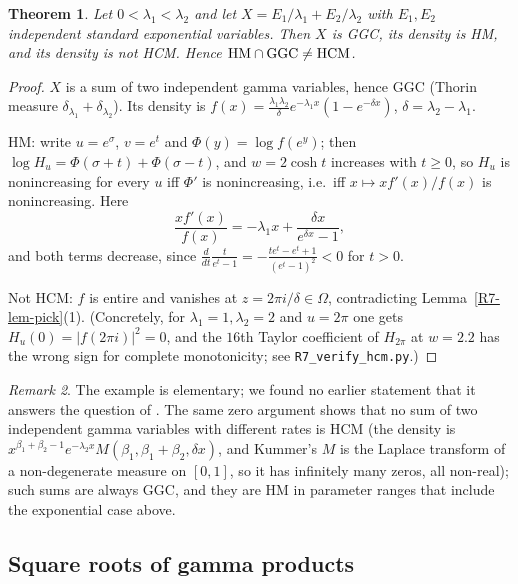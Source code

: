 \documentclass[11pt]{amsart}
\newtheorem{theorem}{Theorem}[section]
\theoremstyle{definition}
\theoremstyle{remark}
\newtheorem{remark}[theorem]{Remark}
\begin{document}
\begin{theorem}\label{R7-thm-JS}
Let $0<\lambda_1<\lambda_2$ and let $X=E_1/\lambda_1+E_2/\lambda_2$ with
$E_1,E_2$ independent standard exponential variables. Then $X$ is GGC, its
density is HM, and its density is not HCM. Hence
$\mathrm{HM}\cap\mathrm{GGC}\ne\mathrm{HCM}$.
\end{theorem}

\begin{proof}
$X$ is a sum of two independent gamma variables, hence GGC (Thorin measure
$\delta_{\lambda_1}+\delta_{\lambda_2}$). Its density is
$f(x)=\frac{\lambda_1\lambda_2}{\delta}e^{-\lambda_1x}(1-e^{-\delta x})$, $\delta=\lambda_2-\lambda_1$.

HM: write $u=e^\sigma$, $v=e^t$ and $\Phi(y)=\log f(e^y)$; then
$\log H_u=\Phi(\sigma+t)+\Phi(\sigma-t)$, and $w=2\cosh t$ increases with
$t\ge0$, so $H_u$ is nonincreasing for every $u$ iff $\Phi'$ is
nonincreasing, i.e.\ iff $x\mapsto xf'(x)/f(x)$ is nonincreasing. Here
\[
 \frac{xf'(x)}{f(x)}=-\lambda_1x+\frac{\delta x}{e^{\delta x}-1},
\]
and both terms decrease, since $\frac{d}{dt}\frac{t}{e^t-1}=
-\frac{te^t-e^t+1}{(e^t-1)^2}<0$ for $t>0$.

Not HCM: $f$ is entire and vanishes at $z=2\pi i/\delta\in\Omega$,
contradicting Lemma~\ref{R7-lem-pick}(1). (Concretely, for
$\lambda_1=1,\lambda_2=2$ and $u=2\pi$ one gets $H_u(0)=|f(2\pi i)|^2=0$,
and the $16$th Taylor coefficient of $H_{2\pi}$ at $w=2.2$ has the wrong sign
for complete monotonicity; see \texttt{R7\_\allowbreak{}verify\_\allowbreak{}hcm.py}.)
\end{proof}

\begin{remark}
The example is elementary; we found no earlier statement that it answers the
question of \cite{R7-JS13}. The same zero argument shows that no sum of two
independent gamma variables with different rates is HCM (the density is
$x^{\beta_1+\beta_2-1}e^{-\lambda_2x}M(\beta_1,\beta_1+\beta_2,\delta x)$, and
Kummer's $M$ is the Laplace transform of a non-degenerate measure on $[0,1]$,
so it has infinitely many zeros, all non-real); such sums are always GGC, and
they are HM in parameter ranges that include the exponential case above.
\end{remark}

\subsection{Square roots of gamma products}
\label{R7-ssec-bosch}
\end{document}
